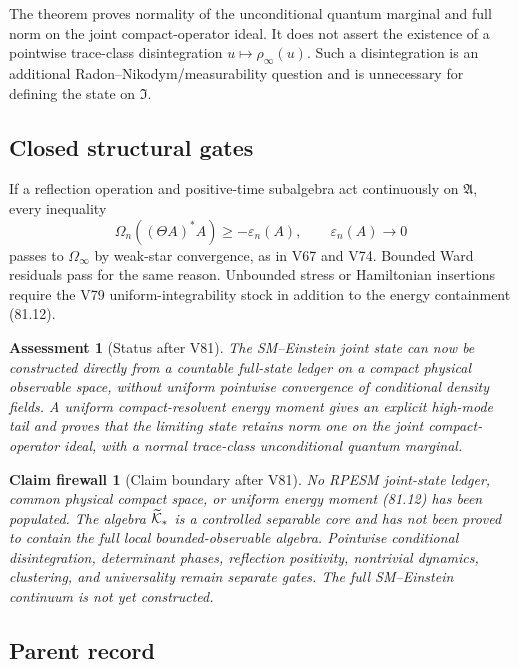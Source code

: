 \documentclass[11pt]{article}
\newtheorem{firewall}[theorem]{Claim firewall}
\newtheorem{assessment}[theorem]{Assessment}
\theoremstyle{remark}
\begin{document}
The theorem proves normality of the unconditional quantum marginal
and full norm on the joint compact-operator ideal.  It does not
assert the existence of a pointwise trace-class disintegration
\(u\mapsto\rho_\infty(u)\).  Such a disintegration is an additional
Radon--Nikodym/measurability question and is unnecessary for defining
the state on \({\mathfrak I}\).

\subsection{Closed structural gates}

If a reflection operation and positive-time subalgebra act
continuously on \({\mathfrak A}\), every inequality
\[
 \Omega_n((\Theta A)^*A)\geq-\varepsilon_n(A),
 \qquad\varepsilon_n(A)\to0
\]
passes to \(\Omega_\infty\) by weak-star convergence, as in V67 and
V74.  Bounded Ward residuals pass for the same reason.  Unbounded
stress or Hamiltonian insertions require the V79 uniform-integrability
stock in addition to the energy containment (81.12).

\begin{assessment}[Status after V81]
\label{ass:v12v81-status}
The SM--Einstein joint state can now be constructed directly from a
countable full-state ledger on a compact physical observable space,
without uniform pointwise convergence of conditional density fields.
A uniform compact-resolvent energy moment gives an explicit
high-mode tail and proves that the limiting state retains norm one
on the joint compact-operator ideal, with a normal trace-class
unconditional quantum marginal.
\end{assessment}

\begin{firewall}[Claim boundary after V81]
\label{fire:v12v81-claim}
No RPESM joint-state ledger, common physical compact space, or
uniform energy moment (81.12) has been populated.  The algebra
\(\widetilde{\cal K}_*\) is a controlled separable core and has not
been proved to contain the full local bounded-observable algebra.
Pointwise conditional disintegration, determinant phases,
reflection positivity, nontrivial dynamics, clustering, and
universality remain separate gates.  The full SM--Einstein continuum
is not yet constructed.
\end{firewall}

\subsection{Parent record}
\end{document}
